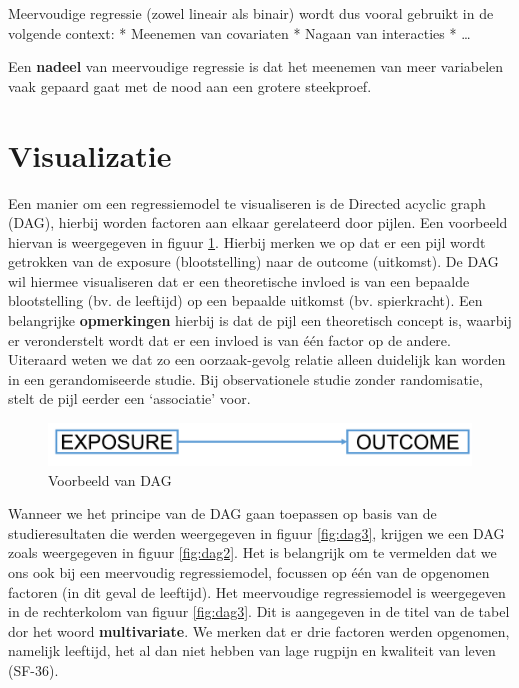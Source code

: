 \documentclass[
]{book}
\theoremstyle{definition}
\theoremstyle{definition}
\theoremstyle{definition}
\theoremstyle{definition}
\theoremstyle{remark}
\begin{document}
Meervoudige regressie (zowel lineair als binair) wordt dus vooral gebruikt in de volgende context: * Meenemen van covariaten * Nagaan van interacties * \ldots{}

Een \textbf{nadeel} van meervoudige regressie is dat het meenemen van meer variabelen vaak gepaard gaat met de nood aan een grotere steekproef.

\hypertarget{visualizatie}{%
\section*{Visualizatie}\label{visualizatie}}


Een manier om een regressiemodel te visualiseren is de Directed acyclic graph (DAG), hierbij worden factoren aan elkaar gerelateerd door pijlen. Een voorbeeld hiervan is weergegeven in figuur \ref{fig:dag1}. Hierbij merken we op dat er een pijl wordt getrokken van de exposure (blootstelling) naar de outcome (uitkomst). De DAG wil hiermee visualiseren dat er een theoretische invloed is van een bepaalde blootstelling (bv. de leeftijd) op een bepaalde uitkomst (bv. spierkracht). Een belangrijke \textbf{opmerkingen} hierbij is dat de pijl een theoretisch concept is, waarbij er veronderstelt wordt dat er een invloed is van één factor op de andere. Uiteraard weten we dat zo een oorzaak-gevolg relatie alleen duidelijk kan worden in een gerandomiseerde studie. Bij observationele studie zonder randomisatie, stelt de pijl eerder een `associatie' voor.

\begin{figure}
\includegraphics[width=0.75\linewidth]{img/dag1} \caption{Voorbeeld van DAG}\label{fig:dag1}
\end{figure}

Wanneer we het principe van de DAG gaan toepassen op basis van de studieresultaten die werden weergegeven in figuur \ref{fig:dag3}, krijgen we een DAG zoals weergegeven in figuur \ref{fig:dag2}. Het is belangrijk om te vermelden dat we ons ook bij een meervoudig regressiemodel, focussen op één van de opgenomen factoren (in dit geval de leeftijd). Het meervoudige regressiemodel is weergegeven in de rechterkolom van figuur \ref{fig:dag3}. Dit is aangegeven in de titel van de tabel dor het woord \textbf{multivariate}. We merken dat er drie factoren werden opgenomen, namelijk leeftijd, het al dan niet hebben van lage rugpijn en kwaliteit van leven (SF-36).
\end{document}

